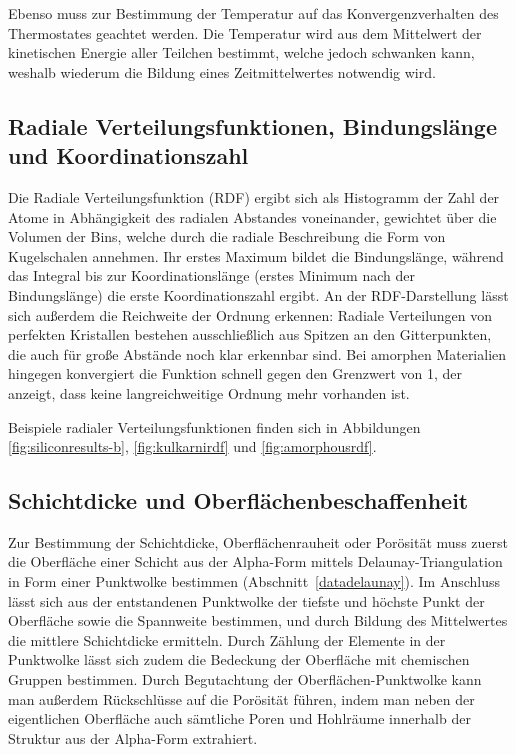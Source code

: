 Ebenso muss zur Bestimmung der Temperatur auf das Konvergenzverhalten des Thermostates geachtet werden.
Die Temperatur wird aus dem Mittelwert der kinetischen Energie aller Teilchen bestimmt, welche jedoch schwanken kann, weshalb wiederum die Bildung eines Zeitmittelwertes notwendig wird.

\subsection{Radiale Verteilungsfunktionen, Bindungslänge und Koordinationszahl}

Die Radiale Verteilungsfunktion (RDF) ergibt sich als Histogramm der Zahl der Atome in Abhängigkeit des radialen Abstandes voneinander, gewichtet über die Volumen der Bins, welche durch die radiale Beschreibung die Form von Kugelschalen annehmen.
Ihr erstes Maximum bildet die Bindungslänge, während das Integral bis zur Koordinationslänge (erstes Minimum nach der Bindungslänge) die erste Koordinationszahl ergibt.
An der RDF-Darstellung lässt sich außerdem die Reichweite der Ordnung erkennen:
Radiale Verteilungen von perfekten Kristallen bestehen ausschließlich aus Spitzen an den Gitterpunkten, die auch für große Abstände noch klar erkennbar sind.
Bei amorphen Materialien hingegen konvergiert die Funktion schnell gegen den Grenzwert von 1, der anzeigt, dass keine langreichweitige Ordnung mehr vorhanden ist.

Beispiele radialer Verteilungsfunktionen finden sich in Abbildungen \ref{fig:siliconresults-b}, \ref{fig:kulkarnirdf} und \ref{fig:amorphousrdf}.


\subsection{Schichtdicke und Oberflächenbeschaffenheit}
\label{mdmethods-surface}

Zur Bestimmung der Schichtdicke, Oberflächenrauheit oder Porösität muss zuerst die Oberfläche einer Schicht aus der Alpha-Form mittels Delaunay-Triangulation in Form einer Punktwolke bestimmen (Abschnitt~\ref{datadelaunay}).
Im Anschluss lässt sich aus der entstandenen Punktwolke der tiefste und höchste Punkt der Oberfläche sowie die Spannweite bestimmen, und durch Bildung des Mittelwertes die mittlere Schichtdicke ermitteln.
Durch Zählung der Elemente in der Punktwolke lässt sich zudem die Bedeckung der Oberfläche mit chemischen Gruppen bestimmen.
Durch Begutachtung der Oberflächen-Punktwolke kann man außerdem Rückschlüsse auf die Porösität führen, indem man neben der eigentlichen Oberfläche auch sämtliche Poren und Hohlräume innerhalb der Struktur aus der Alpha-Form extrahiert.

